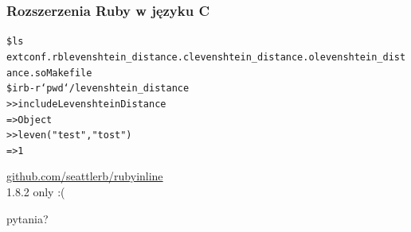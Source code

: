 \documentclass{beamer}
\begin{document}
  \begin{frame}
    \frametitle{Rozszerzenia Ruby w języku C}
    \begin{alltt}
      \$ ls \\
      extconf.rb  levenshtein\_distance.c  levenshtein\_distance.o  levenshtein\_distance.so  Makefile \\
      \$ irb -r `pwd`/levenshtein\_distance \\
      >> include LevenshteinDistance \\
      => Object \\
      >> leven("test", "tost") \\
      => 1
    \end{alltt}
  \end{frame}

  \begin{frame}
    \begin{center}
      \href{https://github.com/seattlerb/rubyinline}{github.com/seattlerb/rubyinline} \\
      1.8.2 only :(
    \end{center}
    
  \end{frame}

  \begin{frame}
    \begin{center}
      {\Huge pytania?}
    \end{center}
  \end{frame}
\end{document}
